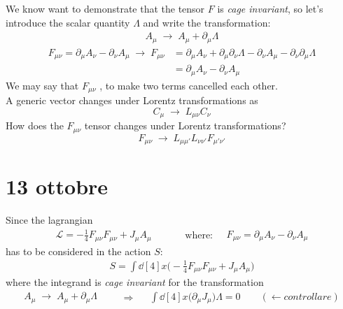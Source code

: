 \documentclass[class=article]{standalone}
\begin{document}
We know want to demonstrate that the tensor $F$ is \emph{cage invariant}, 
so let's introduce the scalar quantity $\Lambda$ and write the transformation:
\begin{equation*}
\begin{split}
A_{\mu} \;\longrightarrow\; A_{\mu} + \partial_{\mu} \Lambda
\end{split}
\end{equation*}
\begin{equation*}
\begin{split}
F_{\mu \nu} = \partial_{\mu} A_{\nu} - \partial_{\nu} A_{\mu}  \;\longrightarrow\; 
F_{\mu \nu} & =  \partial_{\mu} A_{\nu} + \partial_{\mu}\partial_{\nu} \Lambda - \partial_{\nu} A_{\mu} - \partial_{\nu}\partial_{\mu} \Lambda \\
& = \partial_{\mu} A_{\nu} - \partial_{\nu} A_{\mu} 
\end{split}
\end{equation*}
We may say that $F_{\mu \nu}$ , to make two terms cancelled each other. \\
A generic vector changes under Lorentz transformations as
\begin{equation*}
C_{\mu} \;\longrightarrow\; L_{\mu \nu} C_{\nu}
\end{equation*}
How does the $F_{\mu \nu}$ tensor changes under Lorentz transformations?
\begin{equation*}
F_{\mu \nu}  \;\longrightarrow\;   L_{\mu \mu'} L_{\nu \nu'}  F_{\mu' \nu'}
\end{equation*}

\newpage
\section{13 ottobre}
Since the lagrangian 
\begin{equation*}
\begin{split}
\mathcal{L} = -\frac{1}{4} F_{\mu \nu} F_{\mu \nu} + J_{\mu} A_{\mu}
\end{split} \quad\quad\quad \mbox{where:}\quad
\begin{split}
F_{\mu \nu} = \partial_{\mu} A_{\nu} - \partial_{\nu} A_{\mu}
\end{split}
\end{equation*}
has to be considered in the action $S$:
\begin{equation*}
\begin{split}
S = \int \dd[4]{x} \Big( -\frac{1}{4} F_{\mu \nu} F_{\mu \nu} + J_{\mu} A_{\mu} \Big)
\end{split}
\end{equation*}
where the integrand is \emph{cage invariant} for the transformation
\begin{equation*}
\begin{split}
A_{\mu} \;\longrightarrow\; A_{\mu} + \partial_{\mu} \Lambda 
\end{split}\quad\quad\Rightarrow\quad
\begin{split}
\int \dd[4]{x} \Big( \partial_{\mu} J_{\mu} \Big) \Lambda = 0 \quad\quad (\leftarrow controllare)
\end{split}
\end{equation*}
\end{document}

